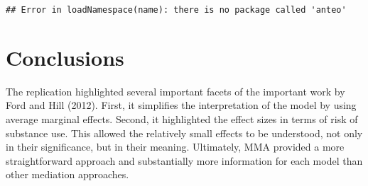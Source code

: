 \documentclass[]{article}
\begin{document}
\begin{verbatim}
## Error in loadNamespace(name): there is no package called 'anteo'
\end{verbatim}

\section{Conclusions}\label{conclusions}

The replication highlighted several important facets of the important
work by Ford and Hill (2012). First, it simplifies the interpretation of
the model by using average marginal effects. Second, it highlighted the
effect sizes in terms of risk of substance use. This allowed the
relatively small effects to be understood, not only in their
significance, but in their meaning. Ultimately, MMA provided a more
straightforward approach and substantially more information for each
model than other mediation approaches.

\singlespacing
\end{document}
